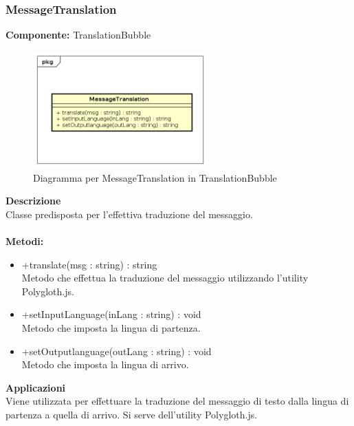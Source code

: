 \subsubsection{MessageTranslation}
\textbf{Componente:}  TranslationBubble\\
   \FloatBarrier
   \begin{figure}[ht]
   \centering
   \includegraphics[width=0.6\textwidth]{img/single-MessageTranslation}
   \caption{{Diagramma per MessageTranslation in TranslationBubble}}
\end{figure}
\FloatBarrier
\textbf{Descrizione}\\
Classe predisposta per l'effettiva traduzione del messaggio.
\\
\\
\textbf{Metodi:} 
\begin{itemize}
\item +translate(msg : string) : string 
\\
Metodo che effettua la traduzione del messaggio utilizzando l'utility Polygloth.js.
\item +setInputLanguage(inLang : string) : void 
\\
Metodo che imposta la lingua di partenza.
\item +setOutputlanguage(outLang : string) : void 
\\
Metodo che imposta la lingua di arrivo.
\end{itemize} 


\textbf{Applicazioni}\\
Viene utilizzata per effettuare la traduzione del messaggio di testo dalla lingua di partenza a quella di arrivo. Si serve dell'utility Polygloth.js. 


\clearpage

